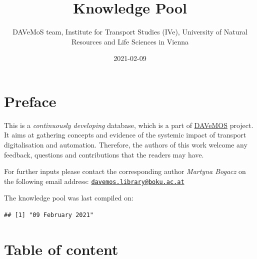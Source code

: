 \documentclass[
]{book}
\title{Knowledge Pool}
\author{DAVeMoS team, Institute for Transport Studies (IVe), University of Natural Resources and Life Sciences in Vienna}
\date{2021-02-09}
\begin{document}
\maketitle

{
\setcounter{tocdepth}{1}
\tableofcontents
}
\hypertarget{preface}{%
\chapter*{Preface}\label{preface}}

This is a \emph{continuously developing} database, which is a part of \href{https://www.davemos.online/}{DAVeMOS} project. It aims at gathering concepts and evidence of the systemic impact of transport digitalisation and automation. Therefore, the authors of this work welcome any feedback, questions and contributions that the readers may have.

For further inputs please contact the corresponding author \emph{Martyna Bogacz} on the following email address: \href{mailto:davemos.library@boku.ac.at}{\nolinkurl{davemos.library@boku.ac.at}}

The knowledge pool was last compiled on:

\begin{verbatim}
## [1] "09 February 2021"
\end{verbatim}

\hypertarget{table-of-content}{%
\chapter*{Table of content}\label{table-of-content}}
\end{document}
